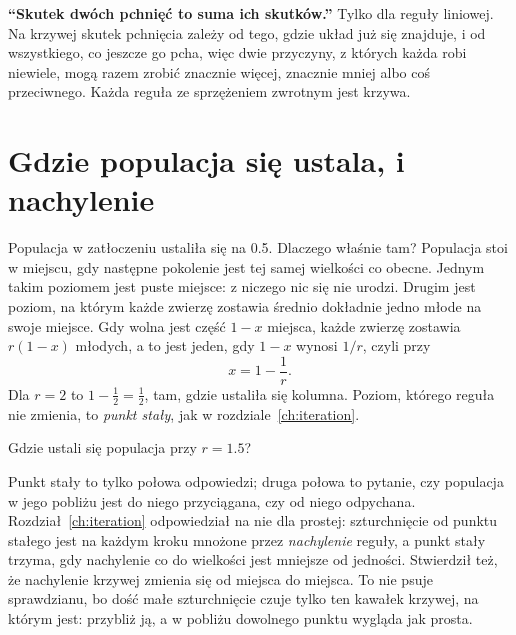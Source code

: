 \begin{trapbox}
\textbf{\enquote{Skutek dwóch pchnięć to suma ich skutków.}} Tylko dla
reguły liniowej. Na krzywej skutek pchnięcia zależy od tego, gdzie
układ już się znajduje, i od wszystkiego, co jeszcze go pcha, więc dwie
przyczyny, z których każda robi niewiele, mogą razem zrobić znacznie więcej,
znacznie mniej albo coś przeciwnego. Każda reguła ze sprzężeniem zwrotnym
jest krzywa.
\end{trapbox}

\section{Gdzie populacja się ustala, i nachylenie}
\label{sec:ch03-slope}

\noindent
Populacja w zatłoczeniu ustaliła się na \num{0.5}. Dlaczego właśnie tam?
Populacja stoi w miejscu, gdy następne pokolenie jest tej samej wielkości co
obecne. Jednym takim poziomem jest puste miejsce: z niczego nic się nie
urodzi. Drugim jest poziom, na którym każde zwierzę zostawia średnio
dokładnie jedno młode na swoje miejsce. Gdy wolna jest część $1 - x$
miejsca, każde zwierzę zostawia $r(1 - x)$ młodych, a to jest jeden, gdy
$1 - x$ wynosi $1/r$, czyli przy
\[ x = 1 - \frac{1}{r}. \]
Dla $r = 2$ to $1 - \tfrac{1}{2} = \tfrac{1}{2}$, tam, gdzie ustaliła się
kolumna. Poziom, którego reguła nie zmienia, to \emph{punkt stały}, jak w
rozdziale~\ref{ch:iteration}.

\begin{think}
Gdzie ustali się populacja przy $r = \num{1.5}$?
\end{think}
Punkt stały to tylko połowa odpowiedzi; druga połowa to pytanie, czy
populacja w jego pobliżu jest do niego przyciągana, czy od niego odpychana.
Rozdział~\ref{ch:iteration} odpowiedział na nie dla prostej: szturchnięcie od
punktu stałego jest na każdym kroku mnożone przez \emph{nachylenie} reguły, a
punkt stały trzyma, gdy nachylenie co do wielkości jest mniejsze od jedności.
Stwierdził też, że nachylenie krzywej zmienia się od miejsca do miejsca. To
nie psuje sprawdzianu, bo dość małe szturchnięcie czuje tylko ten kawałek
krzywej, na którym jest: przybliż ją, a w pobliżu dowolnego punktu wygląda
jak prosta.


